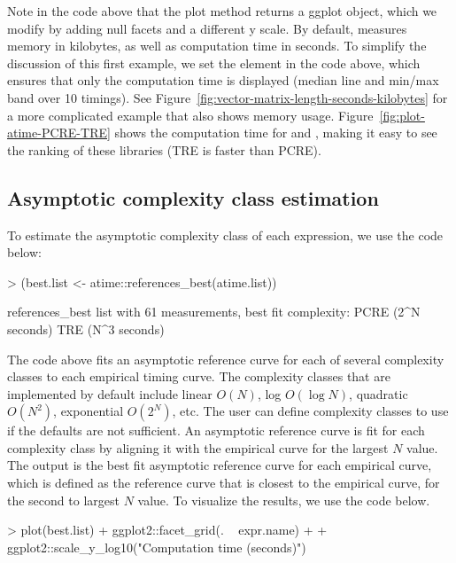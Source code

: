 Note in the code above that the plot method returns a ggplot object, which we modify by adding null facets and a different y scale.
By default,  measures memory in kilobytes, as well as computation time in seconds.
To simplify the discussion of this first example, we set the  element in the code above, which ensures that only the computation time is displayed (median line and min/max band over 10 timings).
See Figure~\ref{fig:vector-matrix-length-seconds-kilobytes} for a more complicated example that also shows memory usage.
Figure~\ref{fig:plot-atime-PCRE-TRE} shows the computation time for  and , making it easy to see the ranking of these libraries (TRE is faster than PCRE).
\subsection{Asymptotic complexity class estimation}

To estimate the asymptotic complexity class of each expression, we use the code below:
\begin{Schunk}
\begin{Sinput}
> (best.list <- atime::references_best(atime.list))
\end{Sinput}
\begin{Soutput}
references_best list with 61 measurements, best fit complexity:
PCRE (2^N seconds)
TRE (N^3 seconds)
\end{Soutput}
\end{Schunk}
The code above fits an asymptotic reference curve for each of several complexity classes to each empirical timing curve. 
The complexity classes that are implemented by default include linear $O(N)$, log $O(\log N)$, quadratic $O(N^2)$, exponential $O(2^N)$, etc.
The user can define complexity classes to use if the defaults are not sufficient. 
An asymptotic reference curve is fit for each complexity class by aligning it with the empirical curve for the largest $N$ value.  
The output is the best fit asymptotic reference curve for each empirical curve, which is defined as the reference curve that is closest to the empirical curve, for the second to largest $N$ value.
To visualize the results, we use the code below.
\begin{Schunk}
\begin{Sinput}
> plot(best.list) + ggplot2::facet_grid(. ~ expr.name) +
+   ggplot2::scale_y_log10("Computation time (seconds)")
\end{Sinput}
\end{Schunk}

